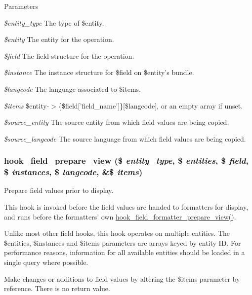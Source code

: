 \begin{DoxyParams}{Parameters}
\item[{\em \$entity\_\-type}]The type of \$entity. \item[{\em \$entity}]The entity for the operation. \item[{\em \$field}]The field structure for the operation. \item[{\em \$instance}]The instance structure for \$field on \$entity's bundle. \item[{\em \$langcode}]The language associated to \$items. \item[{\em \$items}]\$entity-\/$>$\{\$field\mbox{[}'field\_\-name'\mbox{]}\}\mbox{[}\$langcode\mbox{]}, or an empty array if unset. \item[{\em \$source\_\-entity}]The source entity from which field values are being copied. \item[{\em \$source\_\-langcode}]The source language from which field values are being copied. \end{DoxyParams}
\hypertarget{group__field__types_ga02a3004a67ecba2b81eaa63b05d08cc8}{
\subsubsection[{hook\_\-field\_\-prepare\_\-view}]{\setlength{\rightskip}{0pt plus 5cm}hook\_\-field\_\-prepare\_\-view (\$ {\em entity\_\-type}, \/  \$ {\em entities}, \/  \$ {\em field}, \/  \$ {\em instances}, \/  \$ {\em langcode}, \/  \&\$ {\em items})}}
\label{group__field__types_ga02a3004a67ecba2b81eaa63b05d08cc8}
Prepare field values prior to display.

This hook is invoked before the field values are handed to formatters for display, and runs before the formatters' own \hyperlink{group__field__formatter_ga2c1856869caa776fd9e5db4af4e0b57b}{hook\_\-field\_\-formatter\_\-prepare\_\-view()}.

Unlike most other field hooks, this hook operates on multiple entities. The \$entities, \$instances and \$items parameters are arrays keyed by entity ID. For performance reasons, information for all available entities should be loaded in a single query where possible.

Make changes or additions to field values by altering the \$items parameter by reference. There is no return value.


